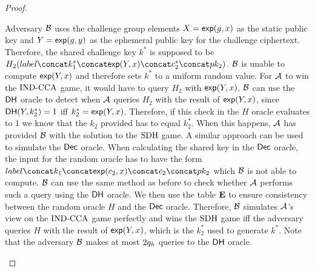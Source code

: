 \documentclass{article}
\begin{document}
\begin{proof}
\begin{itemize}
                                                                                Adversary $\mathcal{B}$ uses the challenge group elements $X = \textsf{exp}(g, x)$ as the static public key and $Y = \textsf{exp}(g, y)$ as the ephemeral public key for the challenge ciphertext.
                                                                                Therefore, the shared challenge key $k^*$ is supposed to be $H_2(label \concat k^*_1 \concat \nexp(Y, x) \concat c^*_2 \concat pk_2)$.
                                                                                $\mathcal{B}$ is unable to compute $\textsf{exp}(Y, x)$ and therefore sets $k^*$ to a uniform random value.
                                                                                For $\mathcal{A}$ to win the $\text{IND-CCA}$ game, it would have to query $H_2$ with $\textsf{exp}(Y, x)$.
                                                                                $\mathcal{B}$ can use the $\textsf{DH}$ oracle to detect when $\mathcal{A}$ queries $H_2$ with the result of $\textsf{exp}(Y, x)$, since $\textsf{DH}(Y, k^*_2) = 1$ iff $k^*_2 = \textsf{exp}(Y, x)$.
                                                                                Therefore, if this check in the $H$ oracle evaluates to $1$ we know that the $k_2$ provided has to equal $k^*_2$.
                                                                                When this happens, $\mathcal{A}$ has provided $\mathcal{B}$ with the solution to the $\text{SDH}$ game.
                                                                                A similar approach can be used to simulate the $\textsf{Dec}$ oracle.
                                                                                When calculating the shared key in the $\textsf{Dec}$ oracle, the input for the random oracle has to have the form $label \concat k_1 \concat \nexp(c_2, x) \concat c_2 \concat pk_2$ which $\mathcal{B}$ is not able to compute.
                                                                                $\mathcal{B}$ can use the same method as before to check whether $\mathcal{A}$ performs such a query using the $\textsf{DH}$ oracle.
                                                                                We then use the table $\mathbf{E}$ to ensure consistency between the random oracle $H$ and the $\textsf{Dec}$ oracle.
                                                                                Therefore, $\mathcal{B}$ simulates $\mathcal{A}$'s view on the $\text{IND-CCA}$ game perfectly and wins the $\text{SDH}$ game iff the adversary queries $H$ with the result of $\textsf{exp}(Y, x)$, which is the $k^*_2$ used to generate $k^*$.
                                                                                Note that the adversary $\mathcal{B}$ makes at most $2 q_h$ queries to the $\textsf{DH}$ oracle.


\end{itemize}
\end{proof}
\end{document}
